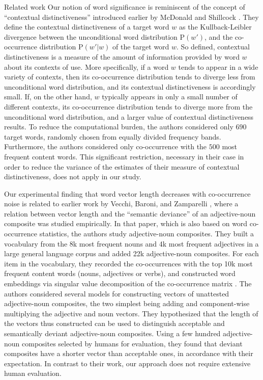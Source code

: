 \documentclass{article} %
\newcommand{\p}{\mathrm{P}}
\begin{document}
\begin{section}{Related work}\label{related-work}
Our notion of word significance is reminiscent of the concept of
``contextual distinctiveness'' introduced earlier by McDonald and
Shillcock \cite{mcdonald2001contextual}.  They define the contextual
distinctiveness of a target word $w$ as the Kullback-Leibler divergence
between the unconditional word distribution $\p(w')$, and the
co-occurrence distribution $\p(w' | w)$ of the target word $w$.  So
defined, contextual distinctiveness is a measure of the amount of
information provided by word $w$ about its contexts of use.  More
specifically, if a word $w$ tends to appear in a wide variety of
contexts, then its co-occurrence distribution tends to diverge less from
unconditional word distribution, and its contextual distinctiveness is
accordingly small.  If, on the other hand, $w$ typically appears in only
a small number of different contexts, its co-occurrence distribution
tends to diverge more from the unconditional word distribution, and a
larger value of contextual distinctiveness results.  To reduce the
computational burden, the authors considered only $690$ target words,
randomly chosen from equally divided frequency bands.  Furthermore, the
authors considered only co-occurrence with the $500$ most frequent
content words.  This significant restriction, necessary in their case in
order to reduce the variance of the estimates of their measure of
contextual distinctiveness, does not apply in our study.

Our experimental finding that word vector length decreases with
co-occurrence noise is related to earlier work by Vecchi, Baroni, and
Zamparelli \cite{vecchi-baroni-zamparelli2011}, where a relation between
vector length and the ``semantic deviance'' of an adjective-noun
composite was studied empirically.  In that paper, which is also based
on word co-occurrence statistics, the authors study adjective-noun
composites.  They built a vocabulary from the 8k most frequent nouns and
4k most frequent adjectives in a large general language corpus and added
22k adjective-noun composites.  For each item in the vocabulary, they
recorded the co-occurrences with the top 10k most frequent content words
(nouns, adjectives or verbs), and constructed word embeddings via
singular value decomposition of the co-occurrence matrix
\cite{landauer-dumais1997}.  The authors considered several models for
constructing vectors of unattested adjective-noun composites, the two
simplest being adding and component-wise multiplying the adjective and
noun vectors.  They hypothesized that the length of the vectors thus
constructed can be used to distinguish acceptable and semantically
deviant adjective-noun composites.  Using a few hundred adjective-noun
composites selected by humans for evaluation, they found that deviant
composites have a shorter vector than acceptable ones, in accordance
with their expectation.  In contrast to their work, our approach does
not require extensive human evaluation.


\end{section}
\end{document}
